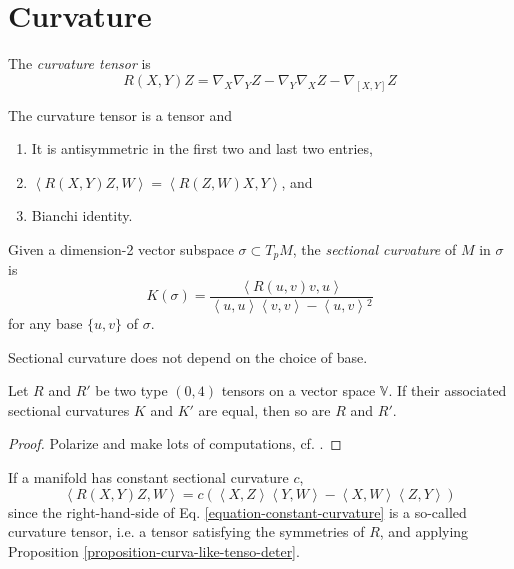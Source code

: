 \documentclass{book}
\begin{document}
\section{Curvature}
\label{section-curvature}

The {\it curvature tensor} is
\begin{equation}
\label{equation-curvature-tensor}
R(X,Y)Z=\nabla_X\nabla_YZ-\nabla_Y\nabla_XZ-
\nabla_{[X,Y]}Z
\end{equation}

\begin{proposition}
\label{proposition-symme-curva-tenso}
The curvature tensor is a tensor and
\begin{enumerate}
\item It is antisymmetric in the first two
and last two entries,
\item
$\left\langle{}R(X,Y)Z,W\right\rangle{}=\left\langle{}R(Z,W)X,
Y\right\rangle{}$,
and
\item Bianchi identity.
\end{enumerate}
\end{proposition}

Given a dimension-2 vector subspace
$\sigma\subset T_pM$, the {\it sectional
curvature} of $M$ in $\sigma$ is
\begin{equation}
\label{equation-sectional-curvature}
K(\sigma)=\frac{\left\langle{}R(u,v)v,u\right\rangle{}}
{\left\langle{}u,u\right\rangle{}\left\langle{}v,v\right\rangle{}-\left\langle{}u,
v\right\rangle{}^2}
\end{equation}
for any base $\{u,v\}$ of $\sigma$.

\begin{lemma}
\label{lemma-secti-curva-well-defin}
Sectional curvature does not depend on the
choice of base.
\end{lemma}

\begin{proposition}
\label{proposition-curva-like-tenso-deter}
Let $R$ and $R'$ be two type $(0,4)$ tensors
on a vector space $\mathbb{V}$. If
their associated sectional curvatures $K$ and
$K'$ are equal, then so are $R$
and $R'$.
\end{proposition}

\begin{proof}
Polarize and make lots of computations, cf.
\cite{doc}.
\end{proof}

If a manifold has constant sectional
curvature $c$,
\begin{equation}
\label{equation-constant-curvature}
\left\langle{}R(X,Y)Z,W\right\rangle{}=
c(\left\langle{}X,Z\right\rangle{}\left\langle{}Y,W\right\rangle{}-\left\langle{}X,
W\right\rangle{}\left\langle{}Z,Y\right\rangle{})
\end{equation}
since the right-hand-side of Eq.
\ref{equation-constant-curvature} is a
so-called curvature tensor, i.e. a tensor
satisfying the symmetries of $R$, and
applying Proposition
\ref{proposition-curva-like-tenso-deter}.
\end{document}
